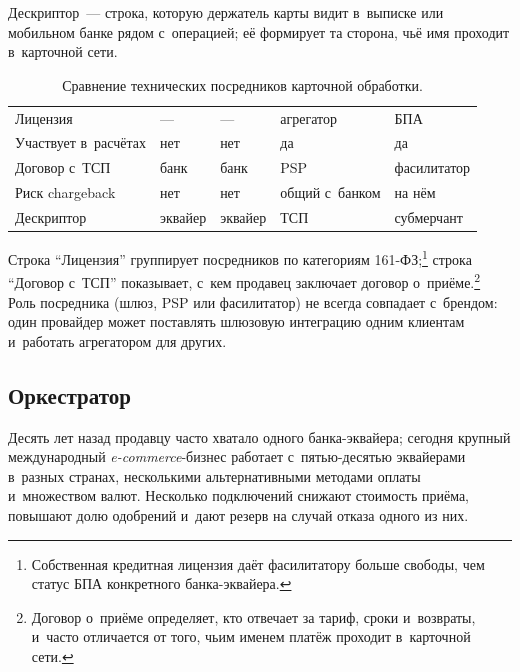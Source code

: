 Дескриптор~--- строка, которую держатель карты видит в~выписке или мобильном
банке рядом с~операцией; её формирует та сторона, чьё имя проходит в~карточной
сети.

\begin{table}[H]
  \caption{Сравнение технических посредников карточной
  обработки.}\label{tab:intermediaries-comparison}
  \begingroup
  \tablesetup
  \begin{tabularx}{\textwidth}{
      @{}P{0.20\textwidth}
      Y
      Y
      Y
      Y@{}
    }
    \toprule
    \headrow
     &
     &
     &
     &
     \\
    \midrule
    Лицензия & --- & --- & агрегатор & БПА \\
    \rowsep
    Участвует в~расчётах & нет & нет & да & да \\
    \rowsep
    Договор с~ТСП & банк & банк & PSP & фасилитатор \\
    \rowsep
    Риск chargeback & нет & нет & общий с~банком & на нём \\
    \rowsep
    Дескриптор & эквайер & эквайер & ТСП & субмерчант \\
    \bottomrule
  \end{tabularx}\par
  \endgroup
\end{table}

Строка \enquote{Лицензия} группирует посредников по категориям
161-ФЗ;\footnote{Собственная кредитная лицензия даёт фасилитатору больше
свободы, чем статус БПА конкретного банка-эквайера.} строка
\enquote{Договор с~ТСП} показывает, с~кем продавец заключает
договор о~приёме.\footnote{Договор о~приёме определяет, кто отвечает за тариф, сроки
  и~возвраты, и~часто отличается от того, чьим именем платёж проходит
в~карточной сети.} Роль посредника (шлюз, PSP или фасилитатор) не всегда
совпадает с~брендом: один провайдер может поставлять шлюзовую интеграцию одним
клиентам и~работать агрегатором для других.

\subsection*{Оркестратор}

Десять лет назад продавцу часто хватало одного банка-эквайера; сегодня крупный
международный \textit{e-commerce}-бизнес работает с~пятью-десятью эквайерами
в~разных странах, несколькими альтернативными методами оплаты и~множеством
валют. Несколько подключений снижают стоимость приёма, повышают долю одобрений
и~дают резерв на случай отказа одного из них.


